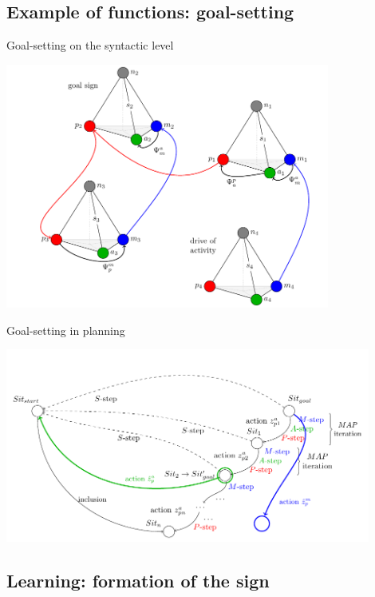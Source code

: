 \documentclass[default]{beamer}
\begin{document}
	\subsection{Example of functions: goal-setting}
	\begin{frame}{Goal-setting on the syntactic level}
		\begin{center}
			\includegraphics[width=0.8\textwidth]{algo/en/goal_set_alg_en}
		\end{center}
		\end{frame}

	\begin{frame}{Goal-setting in planning}
		\begin{center}
			\includegraphics[width=0.9\textwidth]{algo/en/gmap_en}
		\end{center}
		\vspace{-5pt}
		\nocite{*}
		\printbibliography[keyword={goalres}, resetnumbers=true]
	\end{frame}

	\subsection{Learning: formation of the sign}
	
\end{document}
